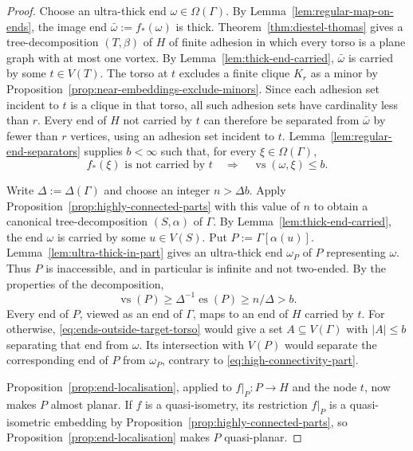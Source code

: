 \documentclass[10pt,a4paper]{amsart}
\theoremstyle{definition}
\begin{document}
\begin{proof}
Choose an ultra-thick end $\omega\in\Omega(\Gamma)$.
By Lemma~\ref{lem:regular-map-on-ends}, the image end $\bar\omega:=f_*(\omega)$ is thick.
Theorem~\ref{thm:diestel-thomas} gives a tree-decomposition $(T,\beta)$ of $H$ of finite adhesion in which every torso is a plane graph with at most one vortex.
By Lemma~\ref{lem:thick-end-carried}, $\bar\omega$ is carried by some $t\in V(T)$.
The torso at $t$ excludes a finite clique $K_r$ as a minor by Proposition~\ref{prop:near-embeddings-exclude-minors}.
Since each adhesion set incident to $t$ is a clique in that torso, all such adhesion sets have cardinality less than $r$.
Every end of $H$ not carried by $t$ can therefore be separated from $\bar\omega$ by fewer than $r$ vertices, using an adhesion set incident to $t$.
Lemma~\ref{lem:regular-end-separators} supplies $b<\infty$ such that, for every $\xi\in\Omega(\Gamma)$,
\begin{equation}\label{eq:ends-outside-target-torso}
f_*(\xi)\text{ is not carried by }t\quad\Longrightarrow\quad\operatorname{vs}(\omega,\xi)\leq b.
\end{equation}


Write $\Delta:=\Delta(\Gamma)$ and choose an integer $n>\Delta b$.
Apply Proposition~\ref{prop:highly-connected-parts} with this value of $n$ to obtain a canonical tree-decomposition $(S,\alpha)$ of $\Gamma$.
By Lemma~\ref{lem:thick-end-carried}, the end $\omega$ is carried by some $u\in V(S)$.
Put $P:=\Gamma[\alpha(u)]$.
Lemma~\ref{lem:ultra-thick-in-part} gives an ultra-thick end $\omega_P$ of $P$ representing $\omega$.
Thus $P$ is inaccessible, and in particular is infinite and not two-ended.
By the properties of the decomposition,
\begin{equation}\label{eq:high-connectivity-part}
\operatorname{vs}(P)\geq\Delta^{-1}\operatorname{es}(P)\geq n/\Delta>b.
\end{equation}
Every end of $P$, viewed as an end of $\Gamma$, maps to an end of $H$ carried by $t$.
For otherwise, \eqref{eq:ends-outside-target-torso} would give a set $A\subseteq V(\Gamma)$ with $|A|\leq b$ separating that end from $\omega$.
Its intersection with $V(P)$ would separate the corresponding end of $P$ from $\omega_P$, contrary to \eqref{eq:high-connectivity-part}.

Proposition~\ref{prop:end-localisation}, applied to $f|_P:P\to H$ and the node $t$, now makes $P$ almost planar.
If $f$ is a quasi-isometry, its restriction $f|_P$ is a quasi-isometric embedding by Proposition~\ref{prop:highly-connected-parts}, so Proposition~\ref{prop:end-localisation} makes $P$ quasi-planar.
\end{proof}
\end{document}
